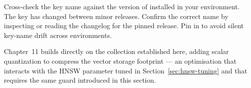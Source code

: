 \begin{tipbox}
Cross-check the  key name against the version
of  installed in your environment. The key has changed between
minor releases. Confirm the correct name by inspecting 
or reading the changelog for the pinned release. Pin  in
 to avoid silent key-name drift across environments.
\end{tipbox}

Chapter~11 builds directly on the collection established here, adding scalar
quantization to compress the vector storage footprint --- an optimisation that
interacts with the HNSW  parameter tuned in
Section~\ref{sec:hnsw-tuning} and that requires the same
 guard introduced in this section.
